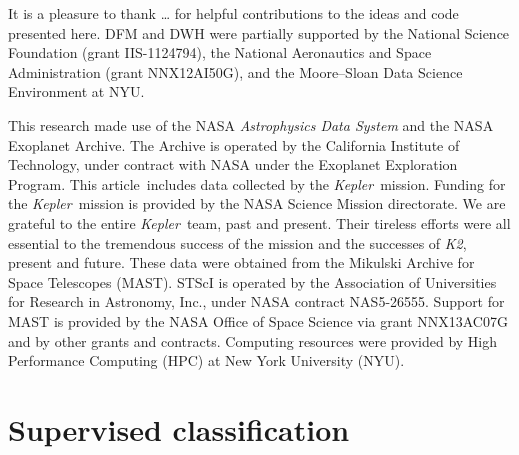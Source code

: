 \documentclass[onecolumn]{aastex6}
\newcommand{\project}[1]{\textsl{#1}}
\newcommand{\kepler}{\project{Kepler}}
\newcommand{\KT}{\project{K2}}
\newcommand{\paper}{article}
\newcommand{\figlabel}[1]{\label{fig:#1}}
\begin{document}
\acknowledgments
It is a pleasure to thank
\ldots
for helpful contributions to the ideas and code presented here.
DFM and DWH were partially supported by the National Science Foundation
(grant IIS-1124794),
the National Aeronautics and Space Administration
(grant NNX12AI50G), and the Moore--Sloan Data Science Environment at NYU.

This research made use of the NASA \project{Astrophysics Data System} and the
NASA Exoplanet Archive.
The Archive is operated by the California Institute of Technology, under
contract with NASA under the Exoplanet Exploration Program.
This \paper\ includes data collected by the \kepler\ mission. Funding for the
\kepler\ mission is provided by the NASA Science Mission directorate.
We are grateful to the entire \kepler\ team, past and present.
Their tireless efforts were all essential to the tremendous success of the mission
and the successes of \KT, present and future.
These data were obtained from the Mikulski Archive for Space Telescopes
(MAST).
STScI is operated by the Association of Universities for Research in
Astronomy, Inc., under NASA contract NAS5-26555.
Support for MAST is provided by the NASA Office of Space Science via grant
NNX13AC07G and by other grants and contracts.
Computing resources were provided by High Performance Computing (HPC) at New
York University (NYU).


\appendix

\section{Supervised classification}


\clearpage

\clearpage


\end{document}
